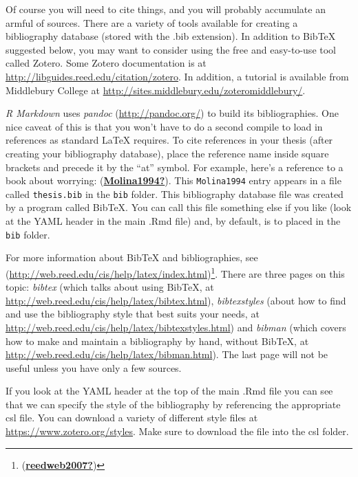 \documentclass [11pt, proquest] {uwthesis}[2015/03/03]
\begin{document}
Of course you will need to cite things, and you will probably accumulate an armful of sources. There are a variety of tools available for creating a bibliography database (stored with the .bib extension). In addition to BibTeX suggested below, you may want to consider using the free and easy-to-use tool called Zotero. Some Zotero documentation is at \url{http://libguides.reed.edu/citation/zotero}. In addition, a tutorial is available from Middlebury College at \url{http://sites.middlebury.edu/zoteromiddlebury/}.

\emph{R Markdown} uses \emph{pandoc} (\url{http://pandoc.org/}) to build its bibliographies. One nice caveat of this is that you won't have to do a second compile to load in references as standard LaTeX requires. To cite references in your thesis (after creating your bibliography database), place the reference name inside square brackets and precede it by the ``at'' symbol. For example, here's a reference to a book about worrying: (\protect\hyperlink{ref-Molina1994}{\textbf{Molina1994?}}). This \texttt{Molina1994} entry appears in a file called \texttt{thesis.bib} in the \texttt{bib} folder. This bibliography database file was created by a program called BibTeX. You can call this file something else if you like (look at the YAML header in the main .Rmd file) and, by default, is to placed in the \texttt{bib} folder.

For more information about BibTeX and bibliographies, see (\url{http://web.reed.edu/cis/help/latex/index.html})\footnote{(\protect\hyperlink{ref-reedweb2007}{\textbf{reedweb2007?}})}. There are three pages on this topic: \emph{bibtex} (which talks about using BibTeX, at \url{http://web.reed.edu/cis/help/latex/bibtex.html}), \emph{bibtexstyles} (about how to find and use the bibliography style that best suits your needs, at \url{http://web.reed.edu/cis/help/latex/bibtexstyles.html}) and \emph{bibman} (which covers how to make and maintain a bibliography by hand, without BibTeX, at \url{http://web.reed.edu/cis/help/latex/bibman.html}). The last page will not be useful unless you have only a few sources.

If you look at the YAML header at the top of the main .Rmd file you can see that we can specify the style of the bibliography by referencing the appropriate csl file. You can download a variety of different style files at \url{https://www.zotero.org/styles}. Make sure to download the file into the csl folder.
\end{document}
